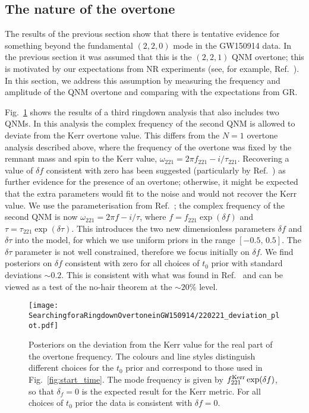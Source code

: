 \subsection{The nature of the overtone}\label{subsec:verify}

The results of the previous section show that there is tentative evidence for something beyond the fundamental $(2,2,0)$ mode in the GW150914 data. 
In the previous section it was assumed that this is the $(2,2,1)$ QNM overtone; this is motivated by our expectations from NR experiments (see, for example, Ref.~\cite{Giesler:2019uxc}). 
In this section, we address this assumption by measuring the frequency and amplitude of the QNM overtone and comparing with the expectations from GR.

Fig.~\ref{fig:delta_f} shows the results of a third ringdown analysis that also includes two QNMs.
In this analysis the complex frequency of the second QNM is allowed to deviate from the Kerr overtone value. 
This differs from the $N=1$ overtone analysis described above, where the frequency of the overtone was fixed by the remnant mass and spin to the Kerr value, $\omega_{221} = 2\pi f_{221} - i/\tau_{221}$.
Recovering a value of $\delta f$ consistent with zero has been suggested (particularly by Ref.~\cite{Isi:2022mhy}) as further evidence for the presence of an overtone; otherwise, it might be expected that the extra parameters would fit to the noise and would not recover the Kerr value.
We use the parameterisation from Ref.~\cite{Isi:2022mhy}; the complex frequency of the second QNM is now $\omega_{221} = 2\pi f-i/\tau$, where $f=f_{221}\exp(\delta f)$ and $\tau=\tau_{221}\exp(\delta \tau)$. 
This introduces the two new dimensionless parameters $\delta f$ and $\delta \tau$ into the model, for which we use uniform priors in the range $[-0.5,\, 0.5]$.
The $\delta \tau$ parameter is not well constrained, therefore we focus initially on $\delta f$.
We find posteriors on $\delta f$ consistent with zero for all choices of $t_0$ prior with standard deviations $\sim 0.2$. 
This is consistent with what was found in Ref.~\cite{Isi:2019aib} and can be viewed as a test of the no-hair theorem at the $\sim 20\%$ level.

\begin{figure}[t]
    \centering
    \texttt{[image: SearchingforaRingdownOvertoneinGW150914/220221\_deviation\_plot.pdf]}
    \caption[Posteriors on the deviation from Kerr for the real part of the GW150914 overtone frequency, for different choices of the ringdown start-time prior]{ 
    Posteriors on the deviation from the Kerr value for the real part of the overtone frequency.
    The colours and line styles distinguish different choices for the $t_0$ prior and correspond to those used in Fig.~\ref{fig:start_time}.
    The mode frequency is given by $f_{221}^{\rm Kerr} \exp(\delta f)$, so that $\delta_f=0$ is the expected result for the Kerr metric.
    For all choices of $t_0$ prior the data is consistent with $\delta f=0$.
    }
    \label{fig:delta_f}
\end{figure}

